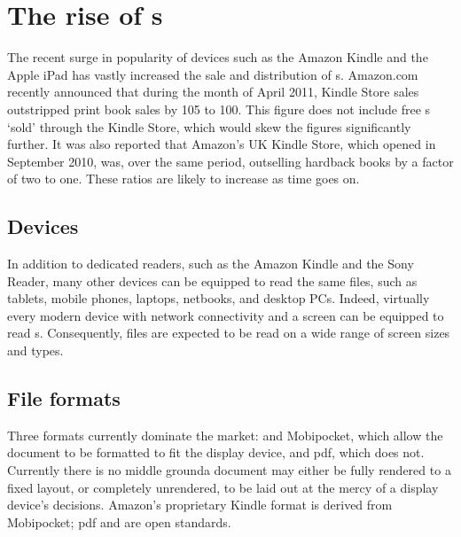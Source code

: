 \cleardoublepage
\chapter{The rise of \ebook{}s} \label{ch:intro} %



The recent surge in popularity of devices such as the Amazon Kindle and the Apple iPad has vastly
increased the sale and distribution of \ebook{}s. Amazon.com recently announced\cite{Amazon.com2011}
that during the month of April 2011, Kindle Store sales outstripped print book sales by 105 to 100.
This figure does not include free \ebook{}s `sold' through the Kindle Store, which would skew the
figures significantly further. It was also reported that Amazon's UK Kindle Store, which opened in
September 2010, was, over the same period, outselling hardback books by a factor of two to one.
These ratios are likely to increase as time goes on.

\section{Devices}
In addition to dedicated \ebook{} readers, such as the Amazon Kindle and the Sony Reader, many other
devices can be equipped to read the same \ebook{} files, such as tablets, mobile phones, laptops,
netbooks, and desktop PCs. Indeed, virtually every modern device with network connectivity and a
screen can be equipped to read \ebook{}s. Consequently, \ebook{} files are expected to be read on a
wide range of screen sizes and types.


\section{File formats}
Three formats currently dominate the \ebook{} market: \epub{} and Mobipocket, which allow the
document to be formatted to fit the display device, and \gls{pdf}, which does not. Currently there is
no middle ground\ed a document may either be fully rendered to a fixed layout, or completely
unrendered, to be laid out at the mercy of a display device's decisions. Amazon's proprietary Kindle
format is derived from Mobipocket; \gls{pdf} and \epub{} are open standards.

